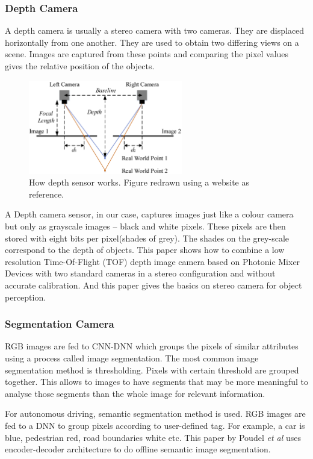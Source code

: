 \subsubsection*{Depth Camera}
A depth camera is usually a stereo camera with two cameras. They are displaced
horizontally from one another. They are used to obtain two differing views on a scene.
Images are captured from these points and comparing the pixel values gives the relative position of
the objects.
\begin{figure}[h]
	\centering
    \includegraphics[width=0.6\textwidth,
    scale=0.1]{figures/inkscape/depthsensor2.png}
    \caption{How depth sensor works. Figure redrawn using a website
    \cite{depthstereodiagramsource} as reference.}
    \label{fig:depthcamera}
\end{figure}
A Depth camera sensor, in our case, captures images just like
a colour camera but only as grayscale images -- black and white pixels. These pixels are
then stored with eight bits per pixel(shades of grey). The shades on the grey-scale correspond to the depth of objects.
This paper \cite{depthsensorpaper1} shows how to combine  a  low  resolution
Time-Of-Flight  (TOF)  depth  image  camera based on Photonic Mixer Devices with two
standard cameras in a stereo configuration and without accurate calibration. And this
paper \cite{depthsensorpaper2} gives the basics on stereo camera for object perception.
\subsubsection*{Segmentation Camera}
RGB images are fed to CNN-DNN which groups the pixels of similar attributes using a
process called image segmentation. The most common image segmentation method is
thresholding. Pixels with certain threshold are grouped together. This allows to images to
have segments that may be more meaningful to analyse those segments than the whole image
for relevant information.

For autonomous driving, semantic segmentation method is used. RGB images are fed to a DNN
to group pixels according to user-defined tag. For example, a car is blue, pedestrian red, road boundaries white etc.
This paper by Poudel \textit{et al} \cite{segmentationpaper} uses encoder-decoder
architecture to do offline semantic image segmentation.

